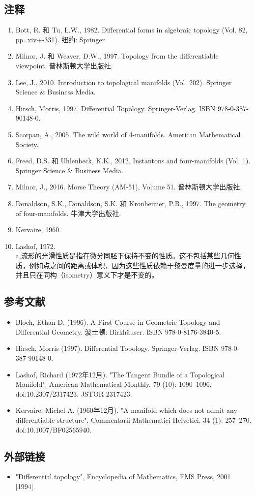 \subsection{注释}
\begin{enumerate}
\item Bott, R. 和 Tu, L.W., 1982. Differential forms in algebraic topology (Vol. 82, pp. xiv+-331). 纽约: Springer.
\item Milnor, J. 和 Weaver, D.W., 1997. Topology from the differentiable viewpoint. 普林斯顿大学出版社.
\item Lee, J., 2010. Introduction to topological manifolds (Vol. 202). Springer Science & Business Media.
\item Hirsch, Morris, 1997. Differential Topology. Springer-Verlag. ISBN 978-0-387-90148-0.
\item Scorpan, A., 2005. The wild world of 4-manifolds. American Mathematical Society.
\item Freed, D.S. 和 Uhlenbeck, K.K., 2012. Instantons and four-manifolds (Vol. 1). Springer Science & Business Media.
\item Milnor, J., 2016. Morse Theory (AM-51), Volume 51. 普林斯顿大学出版社.
\item  Donaldson, S.K., Donaldson, S.K. 和 Kronheimer, P.B., 1997. The geometry of four-manifolds. 牛津大学出版社.
\item Kervaire, 1960.
\item Lashof, 1972.\\
a,流形的光滑性质是指在微分同胚下保持不变的性质。这不包括某些几何性质，例如点之间的距离或体积，因为这些性质依赖于黎曼度量的进一步选择，并且只在同构（isometry）意义下才是不变的。
\end{enumerate}
\subsection{参考文献}
\begin{itemize}
\item Bloch, Ethan D. (1996). A First Course in Geometric Topology and Differential Geometry. 波士顿: Birkhäuser. ISBN 978-0-8176-3840-5.
\item Hirsch, Morris (1997). Differential Topology. Springer-Verlag. ISBN 978-0-387-90148-0.
\item Lashof, Richard (1972年12月). "The Tangent Bundle of a Topological Manifold". American Mathematical Monthly. 79 (10): 1090–1096. doi:10.2307/2317423. JSTOR 2317423.
\item Kervaire, Michel A. (1960年12月). "A manifold which does not admit any differentiable structure". Commentarii Mathematici Helvetici. 34 (1): 257–270. doi:10.1007/BF02565940.
\end{itemize}
\subsection{外部链接}
\begin{itemize}
\item "Differential topology", Encyclopedia of Mathematics, EMS Press, 2001 [1994].
\end{itemize}
